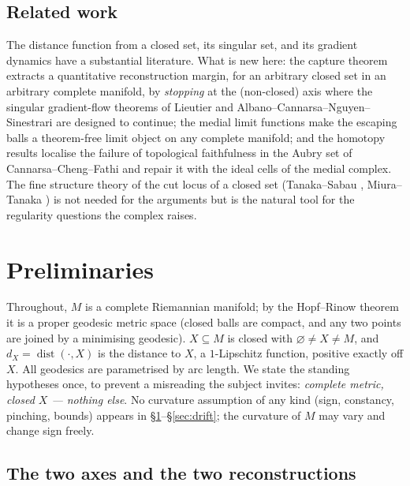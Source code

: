\documentclass[11pt]{article}
\theoremstyle{remark}
\newcommand{\X}{X}
\newcommand{\dist}{\operatorname{dist}}
\newcommand{\dX}{d_{\X}}
\begin{document}
\subsection{Related work}\label{sec:related}

The distance function from a closed set, its singular set, and its
gradient dynamics have a substantial literature. What is new here:
the capture theorem extracts a quantitative reconstruction margin,
for an arbitrary closed set in an arbitrary complete manifold, by
\emph{stopping} at the (non-closed) axis where the singular
gradient-flow theorems of Lieutier \cite{Lie} and
Albano--Cannarsa--Nguyen--Sinestrari \cite{ACNS} are designed to
continue; the medial limit functions make the escaping balls a
theorem-free limit object on any complete manifold; and the homotopy
results localise the failure of topological faithfulness in the
Aubry set of Cannarsa--Cheng--Fathi \cite{CCF} and repair it with
the ideal cells of the medial complex. The fine structure theory of
the cut locus of a closed set (Tanaka--Sabau \cite{TS},
Miura--Tanaka \cite{MT}) is not needed for the arguments but is the
natural tool for the regularity questions the complex raises.

\section{Preliminaries}\label{sec:prelim}

Throughout, $M$ is a complete Riemannian manifold; by the
Hopf--Rinow theorem it is a proper geodesic metric space (closed
balls are compact, and any two points are joined by a minimising
geodesic). $\X\subseteq M$ is closed with $\varnothing\neq\X\neq M$,
and $\dX=\dist(\cdot,\X)$ is the distance to $\X$, a $1$-Lipschitz
function, positive exactly off $\X$. All geodesics are parametrised
by arc length. We state the standing hypotheses once, to prevent a
misreading the subject invites: \emph{complete metric, closed $\X$
--- nothing else}. No curvature assumption of any kind (sign,
constancy, pinching, bounds) appears in
\S\ref{sec:prelim}--\S\ref{sec:drift}; the curvature of $M$ may vary
and change sign freely.

\subsection{The two axes and the two reconstructions}
\end{document}
